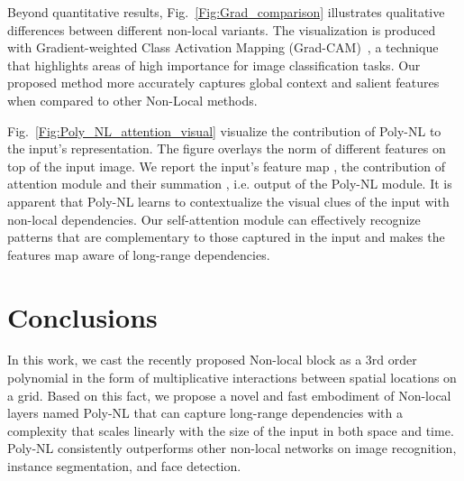 \documentclass[10pt,twocolumn,letterpaper]{article}
\begin{document}
Beyond quantitative results, Fig.~\ref{Fig:Grad_comparison} illustrates qualitative differences between different non-local variants. The visualization is produced with Gradient-weighted Class Activation
Mapping (Grad-CAM)~\cite{selvaraju2017grad}, a technique that highlights areas of high importance for image classification tasks. Our proposed method more accurately captures global context and salient features when compared to other Non-Local methods.

Fig.~\ref{Fig:Poly_NL_attention_visual} visualize the contribution of Poly-NL to the input's representation. 
The figure overlays the norm of different features on top of the input image. We report the input's feature map , the contribution of attention module  and their summation , i.e. output of the Poly-NL module. It is apparent that Poly-NL learns to contextualize the visual clues of the input with non-local dependencies. Our self-attention module can effectively recognize patterns that are complementary to those captured in the input and makes the features map aware of long-range dependencies. 

\section{Conclusions}
In this work, we cast the recently proposed Non-local block as a 3rd order polynomial in the form of multiplicative interactions between spatial locations on a grid. Based on this fact, we propose a novel and fast embodiment of Non-local layers named Poly-NL that can capture long-range dependencies with a complexity that scales linearly with the size of the input in both space and time. Poly-NL consistently outperforms other non-local networks on image recognition, instance segmentation, and face detection. 

{\small


}
\end{document}
